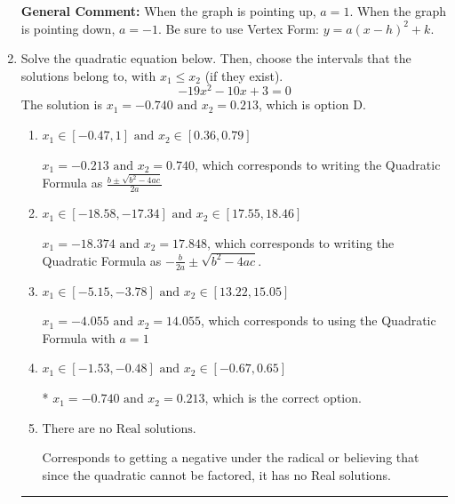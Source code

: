\documentclass{extbook}[14pt]
\newcommand{\litem}[1]{\item #1

\rule{\textwidth}{0.4pt}}
\begin{document}
\begin{enumerate}
{\textbf{General Comment:} When the graph is pointing up, $a=1$. When the graph is pointing down, $a=-1$. Be sure to use Vertex Form: $y = a(x-h)^2+k$.
}
\litem{
Solve the quadratic equation below. Then, choose the intervals that the solutions belong to, with $x_1 \leq x_2$ (if they exist).
\[ -19x^{2} -10 x + 3 = 0 \]The solution is \( x_1 = -0.740 \text{ and } x_2 = 0.213 \), which is option D.\begin{enumerate}[label=\Alph*.]
\item \( x_1 \in [-0.47, 1] \text{ and } x_2 \in [0.36, 0.79] \)

 $x_1 = -0.213 \text{ and } x_2 = 0.740$, which corresponds to writing the Quadratic Formula as $\frac{b \pm \sqrt{b^2 - 4ac}}{2a}$
\item \( x_1 \in [-18.58, -17.34] \text{ and } x_2 \in [17.55, 18.46] \)

 $x_1 = -18.374 \text{ and } x_2 = 17.848$, which corresponds to writing the Quadratic Formula as $-\frac{b}{2a} \pm \sqrt{b^2 - 4ac}$.
\item \( x_1 \in [-5.15, -3.78] \text{ and } x_2 \in [13.22, 15.05] \)

 $x_1 = -4.055 \text{ and } x_2 = 14.055$, which corresponds to using the Quadratic Formula with $a=1$
\item \( x_1 \in [-1.53, -0.48] \text{ and } x_2 \in [-0.67, 0.65] \)

* $x_1 = -0.740 \text{ and } x_2 = 0.213$, which is the correct option.
\item \( \text{There are no Real solutions.} \)

Corresponds to getting a negative under the radical or believing that since the quadratic cannot be factored, it has no Real solutions.
\end{enumerate}

}
\end{enumerate}
\end{document}
